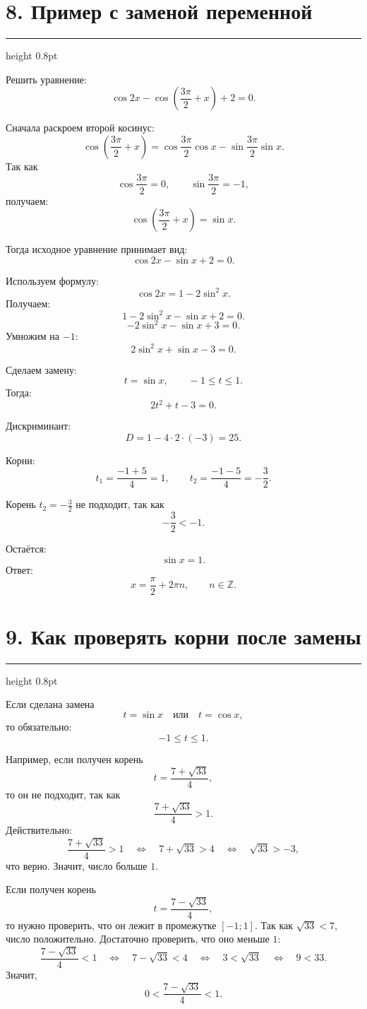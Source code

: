 \documentclass[a4paper,12pt]{article}
\newcommand{\sectionline}{\vspace{0.2em}\textcolor{accent}{\hrule height 0.8pt}\vspace{0.7em}}
\newcommand{\Z}{\mathbb{Z}}
\begin{document}
\section*{8. Пример с заменой переменной}
\sectionline

Решить уравнение:
\[
\cos 2x-\cos\left(\frac{3\pi}{2}+x\right)+2=0.
\]

Сначала раскроем второй косинус:
\[
\cos\left(\frac{3\pi}{2}+x\right)
=
\cos\frac{3\pi}{2}\cos x-\sin\frac{3\pi}{2}\sin x.
\]
Так как
\[
\cos\frac{3\pi}{2}=0,
\qquad
\sin\frac{3\pi}{2}=-1,
\]
получаем:
\[
\cos\left(\frac{3\pi}{2}+x\right)=\sin x.
\]

Тогда исходное уравнение принимает вид:
\[
\cos2x-\sin x+2=0.
\]

Используем формулу:
\[
\cos2x=1-2\sin^2x.
\]
Получаем:
\[
1-2\sin^2x-\sin x+2=0.
\]
\[
-2\sin^2x-\sin x+3=0.
\]
Умножим на \(-1\):
\[
2\sin^2x+\sin x-3=0.
\]

Сделаем замену:
\[
t=\sin x,
\qquad
-1\le t\le 1.
\]
Тогда:
\[
2t^2+t-3=0.
\]

Дискриминант:
\[
D=1-4\cdot2\cdot(-3)=25.
\]

Корни:
\[
t_1=\frac{-1+5}{4}=1,
\qquad
t_2=\frac{-1-5}{4}=-\frac32.
\]

Корень \(t_2=-\frac32\) не подходит, так как
\[
-\frac32<-1.
\]

Остаётся:
\[
\sin x=1.
\]
Ответ:
\[
x=\frac{\pi}{2}+2\pi n,
\qquad n\in\Z.
\]

\section*{9. Как проверять корни после замены}
\sectionline

Если сделана замена
\[
t=\sin x
\quad \text{или} \quad
t=\cos x,
\]
то обязательно:
\[
-1\le t\le 1.
\]

Например, если получен корень
\[
t=\frac{7+\sqrt{33}}{4},
\]
то он не подходит, так как
\[
\frac{7+\sqrt{33}}{4}>1.
\]
Действительно:
\[
\frac{7+\sqrt{33}}{4}>1
\quad\Longleftrightarrow\quad
7+\sqrt{33}>4
\quad\Longleftrightarrow\quad
\sqrt{33}>-3,
\]
что верно. Значит, число больше \(1\).

Если получен корень
\[
t=\frac{7-\sqrt{33}}{4},
\]
то нужно проверить, что он лежит в промежутке \([-1;1]\). Так как \(\sqrt{33}<7\), число положительно. Достаточно проверить, что оно меньше \(1\):
\[
\frac{7-\sqrt{33}}{4}<1
\quad\Longleftrightarrow\quad
7-\sqrt{33}<4
\quad\Longleftrightarrow\quad
3<\sqrt{33}
\quad\Longleftrightarrow\quad
9<33.
\]
Значит,
\[
0<\frac{7-\sqrt{33}}{4}<1.
\]
\end{document}
